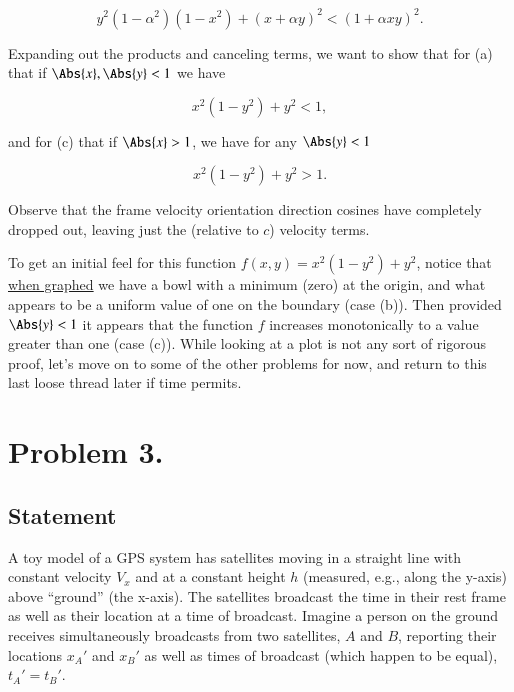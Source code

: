 \begin{equation}\label{eqn:relativisticElectrodynamicsA1:280}
y^2 (1 - \alpha^2)(1 - x^2) + (x + \alpha y)^2 < (1 + \alpha x y)^2 .
\end{equation}

Expanding out the products and canceling terms, we want to show that for (a) that if $\Abs{x},\Abs{y} < 1$ we have

\begin{equation}\label{eqn:relativisticElectrodynamicsA1:290a}
x^2 (1 - y^2) + y^2 < 1,
\end{equation}

and for (c) that if $\Abs{x} > 1$, we have for any $\Abs{y} < 1$

\begin{equation}\label{eqn:relativisticElectrodynamicsA1:290c}
x^2 (1 - y^2) + y^2 > 1.
\end{equation}

Observe that the frame velocity orientation direction cosines have completely dropped out, leaving just the (relative to $c$) velocity terms.

To get an initial feel for this function $f(x,y) = x^2 (1 - y^2) + y^2$, notice that \href{http://goo.gl/5AnNF}{when graphed} we have a bowl with a minimum (zero) at the origin, and what appears to be a uniform value of one on the boundary (case (b)).  Then provided $\Abs{y} < 1$ it appears that the function $f$ increases monotonically to a value greater than one (case (c)).  While looking at a plot is not any sort of rigorous proof, let's move on to some of the other problems for now, and return to this last loose thread later if time permits.

\section{Problem 3.}
\subsection{Statement}

A toy model of a GPS system has satellites moving in a straight line with constant velocity $V_x$ and at a constant height $h$ (measured, e.g., along the y-axis) above ``ground'' (the x-axis).  The satellites broadcast the time in their rest frame as well as their location at a time of broadcast.  Imagine a person on the ground receives simultaneously broadcasts from two satellites, $A$ and $B$, reporting their locations $x_A'$ and $x_B'$ as well as times of broadcast (which happen to be equal), $t_A' = t_B'$.	

